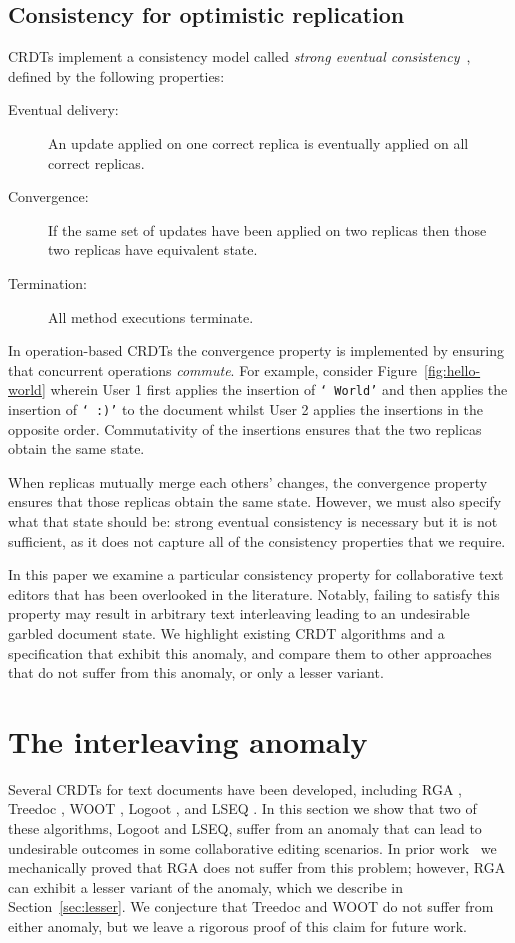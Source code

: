 \documentclass[sigconf]{acmart}
\begin{document}
\subsection{Consistency for optimistic replication}

CRDTs implement a consistency model called \emph{strong eventual consistency}~\cite{Shapiro:2011un,Gomes:2017gy}, defined by the following properties:
\begin{description}
\item[Eventual delivery:] An update applied on one correct replica is eventually applied on all correct replicas.
\item[Convergence:] If the same set of updates have been applied on two replicas then those two replicas have equivalent state.
\item[Termination:] All method executions terminate.
\end{description}
In operation-based CRDTs the convergence property is implemented by ensuring that concurrent operations \emph{commute}.
For example, consider Figure~\ref{fig:hello-world} wherein User 1 first applies the insertion of \texttt{` World'} and then applies the insertion of \texttt{` :)'} to the document whilst User 2 applies the insertions in the opposite order.
Commutativity of the insertions ensures that the two replicas obtain the same state.

When replicas mutually merge each others' changes, the convergence property ensures that those replicas obtain the same state.
However, we must also specify what that state should be: strong eventual consistency is necessary but it is not sufficient, as it does not capture all of the consistency properties that we require.

In this paper we examine a particular consistency property for collaborative text editors that has been overlooked in the literature.
Notably, failing to satisfy this property may result in arbitrary text interleaving leading to an undesirable garbled document state.
We highlight existing CRDT algorithms and a specification that exhibit this anomaly, and compare them to other approaches that do not suffer from this anomaly, or only a lesser variant.

\section{The interleaving anomaly}\label{sec:anomaly}

Several CRDTs for text documents have been developed, including RGA \cite{Roh:2011dw}, Treedoc \cite{Preguica:2009fz}, WOOT \cite{Oster:2006wj}, Logoot \cite{Weiss:2009ht,Weiss:2010hx}, and LSEQ \cite{Nedelec:2013ky,Nedelec:2016eo}.
In this section we show that two of these algorithms, Logoot and LSEQ, suffer from an anomaly that can lead to undesirable outcomes in some collaborative editing scenarios.
In prior work~\cite{ExtendedVersion,AFP} we mechanically proved that RGA does not suffer from this problem; however, RGA can exhibit a lesser variant of the anomaly, which we describe in Section~\ref{sec:lesser}.
We conjecture that Treedoc and WOOT do not suffer from either anomaly, but we leave a rigorous proof of this claim for future work.
\end{document}
